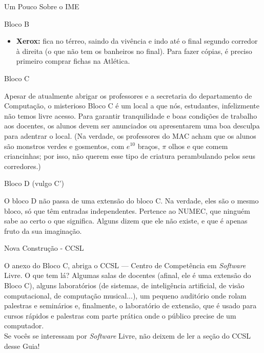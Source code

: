 \begin{secao}{Um Pouco Sobre o IME}
\begin{subsecao}{Bloco B}
\begin{itemize}
\item{\bf Xerox:} fica no térreo, saindo da vivência e indo até o final segundo
  corredor à direita (o que não tem os banheiros no final). Para fazer cópias,
  é preciso primeiro comprar fichas na Atlética.
\end{itemize}

\end{subsecao}

\begin{subsecao}{Bloco C}

Apesar de atualmente abrigar os professores e a secretaria do departamento de
Computação, o misterioso Bloco C é um local a que nós, estudantes, infelizmente não
temos livre acesso. Para garantir tranquilidade e boas condições de trabalho aos
docentes, os alunos devem ser anunciados ou apresentarem uma boa desculpa para
adentrar o local. (Na verdade, os professores do MAC acham que os alunos são monstros
verdes e gosmentos, com $e^{10}$ braços, $\pi$ olhos e que comem criancinhas;
por isso, não querem esse tipo de criatura perambulando pelos seus corredores.)

\end{subsecao}

\begin{subsecao}{Bloco D (vulgo C')}

O bloco D não passa de uma extensão do bloco C. Na verdade, eles são o mesmo bloco,
só que têm entradas independentes. Pertence ao NUMEC, que ninguém sabe ao certo
o que significa. Alguns dizem que ele não existe, e que é apenas fruto da sua
imaginação.

\end{subsecao}

\begin{subsecao}{Nova Construção - CCSL}

O anexo do Bloco C, abriga o CCSL --- Centro de Competência em \textit{Software}
Livre. O que tem lá? Algumas salas de docentes (afinal, ele é uma extensão do
Bloco C), alguns laboratórios (de sistemas, de inteligência artificial,
de visão computacional, de computação musical...), um pequeno auditório
onde rolam palestras e seminários e, finalmente, o laboratório de extensão,
que é usado para cursos rápidos e palestras com parte prática onde o público
precise de um computador.\\
Se vocês se interessam por \textit{Software} Livre, não deixem de ler a seção
do CCSL desse Guia!

\end{subsecao}


\end{secao}
